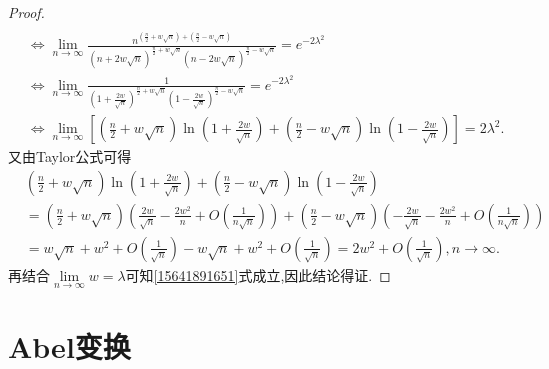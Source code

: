 \documentclass[lang=cn,newtx,10pt,scheme=chinese]{elegantbook}
\begin{document}
\begin{proof}
\begin{align}
\nonumber
\\
&\Leftrightarrow \lim_{n\rightarrow \infty} \frac{n^{\left( \frac{n}{2}+w\sqrt{n} \right) +\left( \frac{n}{2}-w\sqrt{n} \right)}}{(n+2w\sqrt{n})^{\frac{n}{2}+w\sqrt{n}}(n-2w\sqrt{n})^{\frac{n}{2}-w\sqrt{n}}}=e^{-2\lambda ^2}
\nonumber
\\
&\Leftrightarrow \lim_{n\rightarrow \infty} \frac{1}{\left( 1+\frac{2w}{\sqrt{n}} \right) ^{\frac{n}{2}+w\sqrt{n}}\left( 1-\frac{2w}{\sqrt{n}} \right) ^{\frac{n}{2}-w\sqrt{n}}}=e^{-2\lambda ^2}
\nonumber
\\
&\Leftrightarrow \lim_{n\rightarrow \infty} \left[ \left( \frac{n}{2}+w\sqrt{n} \right) \ln \left( 1+\frac{2w}{\sqrt{n}} \right) +\left( \frac{n}{2}-w\sqrt{n} \right) \ln \left( 1-\frac{2w}{\sqrt{n}} \right) \right] =2\lambda ^2.\label{15641891651}
\end{align}
又由Taylor公式可得
\begin{align*}
&\left( \frac{n}{2}+w\sqrt{n} \right) \ln \left( 1+\frac{2w}{\sqrt{n}} \right) +\left( \frac{n}{2}-w\sqrt{n} \right) \ln \left( 1-\frac{2w}{\sqrt{n}} \right) 
\\
&=\left( \frac{n}{2}+w\sqrt{n} \right) \left( \frac{2w}{\sqrt{n}}-\frac{2w^2}{n}+O\left( \frac{1}{n\sqrt{n}} \right) \right) +\left( \frac{n}{2}-w\sqrt{n} \right) \left( -\frac{2w}{\sqrt{n}}-\frac{2w^2}{n}+O\left( \frac{1}{n\sqrt{n}} \right) \right) 
\\
&=w\sqrt{n}+w^2+O\left( \frac{1}{\sqrt{n}} \right) -w\sqrt{n}+w^2+O\left( \frac{1}{\sqrt{n}} \right) =2w^2+O\left( \frac{1}{\sqrt{n}} \right) ,n\to \infty.
\end{align*}
再结合$\underset{n\rightarrow \infty}{\lim}w=\lambda$可知\eqref{15641891651}式成立,因此结论得证.
\end{proof}


\section{Abel变换}
\end{document}

